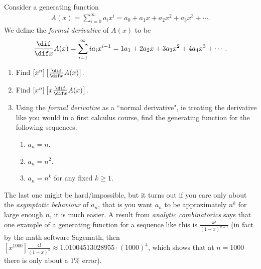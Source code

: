 \begin{enumerate}
    Consider a generating function
    \begin{align*}
        A(x) = \sum_{i=0}^\infty a_i x^i = a_0 + a_1 x + a_2 x^2 + a_3 x^3 + \cdots.
    \end{align*}
    We define the \textit{formal derivative} of $A(x)$ to be
    \begin{align*}
        \frac{\dif}{ \dif x} A(x) = \sum_{i = 1}^\infty i a_i x^{i-1} = 1 a_1 + 2 a_2 x + 3 a_3 x^2 + 4 a_4 x^3 + \cdots.
    \end{align*}
    \begin{enumerate}
        \item Find $[x^n] \left[ \frac{\dif}{\dif x} A(x) \right]$.
        \item Find $[x^n] \left[ x \frac{\dif }{\dif x} A(x)  \right]$.
        \item Using the \textit{formal derivative} as a ``normal derivative", ie treating the derivative like you would in a first calculus course, find the generating function for the following sequences.
        \begin{enumerate}
            \item $a_n = n$.
            \item $a_n = n^2$.
            \item $a_n = n^k$ for any fixed $k \geq 1$.
        \end{enumerate}
    \end{enumerate}
    \begin{remark}
        The last one might be hard/impossible, but it turns out if you care only about the \textit{asymptotic behaviour} of $a_n$, that is you want $a_n$ to be approximately $n^k$ for large enough $n$, it is much easier. A result from \textit{analytic combinatorics} says that one example of a generating function for a sequence like this is $\frac{k!}{(1-x)^{k+1}}$ (in fact by the math software Sagemath, then $[x^{1000}] \frac{4!}{(1-x)^5} \approx 1.01004513028955 \cdot (1000)^4$, which shows that at $n=1000$ there is only about a $1 \%$ error).
    \end{remark}
\end{enumerate}